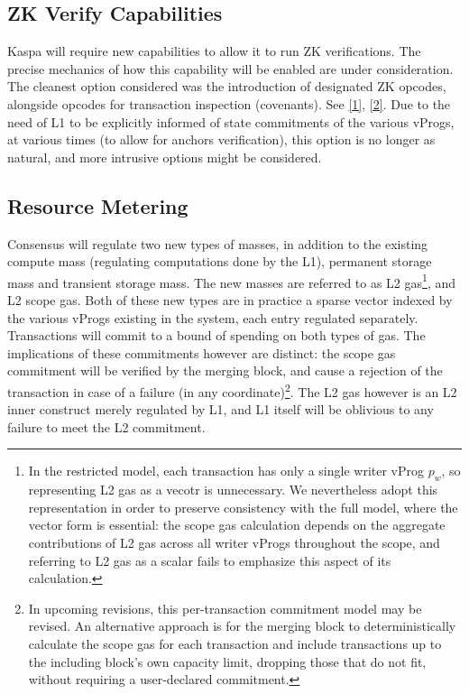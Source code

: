 \documentclass[onecolumn, 9pt, a4paper]{extarticle}
\begin{document}
\subsection{ZK Verify Capabilities}
Kaspa will require new capabilities to allow it to run ZK verifications. The precise mechanics of how this capability
will be enabled are under consideration. The cleanest option considered was the introduction of designated ZK
opcodes, alongside opcodes for transaction inspection (covenants). See \href{https://research.kas.pa/t/on-the-design-of-based-zk-rollups-over-kaspas-utxo-based-dag-consensus/208}{[1]}, \href{https://research.kas.pa/t/l1-l2-canonical-bridge-entry-exit-mechanism/258}{[2]}. Due to the need of L1
to be explicitly informed of state commitments of the various vProgs, at various times (to allow for anchors
verification), this option is no longer as natural, and more intrusive options might be considered.

\subsection{Resource Metering}
Consensus will regulate two new types of masses, in addition to the existing compute mass (regulating computations done by the L1), permanent storage mass and transient storage mass. The new masses are referred to as L2 gas\footnote{ In the restricted model, each transaction has only a single writer vProg $p_w$, so representing L2 gas as a vecotr is unnecessary. We nevertheless adopt this representation in order to preserve consistency with the full model, where the vector form is essential: the scope gas calculation depends on the aggregate contributions of L2 gas across all writer vProgs throughout the scope, and referring to L2 gas as a scalar fails to emphasize this aspect of its calculation.}, and L2 scope gas. Both of these new types are in practice a sparse vector indexed by the various vProgs existing in the system, each entry regulated separately. Transactions will commit to a bound of spending on both types of gas. The implications of these commitments however are distinct: the scope gas commitment will be verified by the merging block, and cause a rejection of the transaction in case of a failure (in any coordinate)\footnote{In upcoming revisions, this per-transaction commitment model may be revised. An alternative approach is for the merging block to deterministically calculate the scope gas for each transaction and include transactions up to the including block's own capacity limit, dropping those that do not fit, without requiring a user-declared commitment.}. The L2 gas however is an L2 inner construct merely regulated by L1, and L1 itself will be oblivious to any failure to meet the L2 commitment.  
\end{document}
